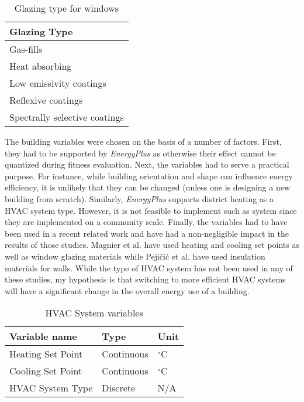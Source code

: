 \begin{table}[htbp]
    \centering
    \begin{tabular}{|l|}
    \hline
    Glazing Type             \\ \hline
    Gas-fills                 \\
    Heat absorbing             \\
    Low emissivity coatings     \\
    Reflexive coatings           \\
    Spectrally selective coatings \\ \hline
    \end{tabular}
    \caption{Glazing type for windows}
    \label{table:glazing}
\end{table}


The building variables were chosen on the basis of a number of factors. First, they had to be supported by \textit{EnergyPlus} as otherwise their effect cannot be quantized during fitness evaluation. Next, the variables had to serve a practical purpose. For instance, while building orientation and shape can influence energy efficiency, it is unlikely that they can be changed (unless one is designing a new building from scratch). Similarly, \textit{EnergyPlus} supports district heating as a HVAC system type. However, it is not feasible to implement such as system since they are implemented on a community scale. Finally, the variables had to have been used in a recent related work and have had a non-negligible impact in the results of those studies. Magnier et al. \cite{Magnier2010} have used heating and cooling set points as well as window glazing materials while Peji\v{c}i\'{c} et al. \cite{Pejicic2012} have used insulation materials for walls. While the type of HVAC system has not been used in any of these studies, my hypothesis is that switching to more efficient HVAC systems will have a significant change in the overall energy use of a building.

\begin{table}[htbp]
    \centering
    \begin{tabular}{|l|l|l|}
    \hline
    Variable name                  & Type       & Unit                      \\ \hline
    Heating Set Point              & Continuous & $^{\circ}$C                       \\
    Cooling Set Point              & Continuous & $^{\circ}$C                       \\
    HVAC System Type               & Discrete   & N/A                        \\ \hline
    \end{tabular}
    \caption{HVAC System variables }
    \label{table:hvac}
\end{table}

